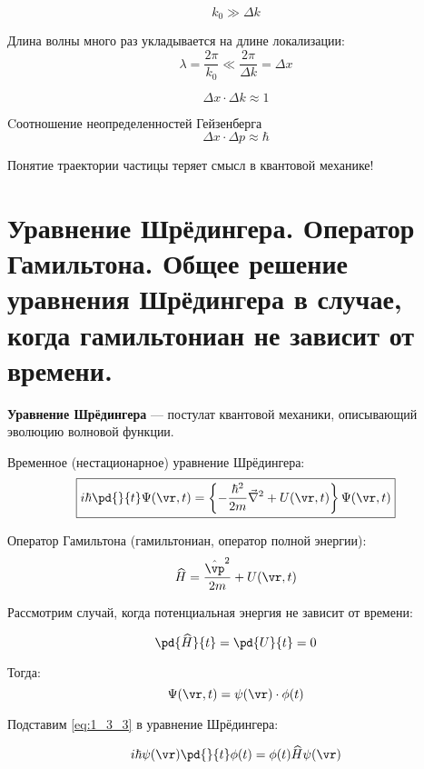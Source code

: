 $$k_0 \gg \Delta k$$

Длина волны много раз укладывается на длине локализации:
$$\lambda = \frac{2 \pi}{k_0} \ll \frac{2 \pi}{\Delta k} = \Delta x$$

\begin{equation}
\label{eq:1_2_9}
\Delta x \cdot \Delta k \approx 1
\end{equation}

Cоотношение неопределенностей Гейзенберга
\begin{equation}
\label{eq:1_2_10}
\boxed{\Delta x \cdot \Delta p \approx \hbar}
\end{equation}

Понятие траектории частицы теряет смысл в квантовой механике!

\begin{sloppypar}
  \section{Уравнение Шрёдингера. Оператор Гамильтона. Общее решение уравнения Шрёдингера в случае, когда гамильтониан не зависит от времени.}
\end{sloppypar}

\textbf{Уравнение Шрёдингера} --- постулат квантовой механики, описывающий эволюцию волновой функции.

Временное (нестационарное) уравнение Шрёдингера:
\begin{equation}
\label{eq:1_3_1}
\boxed{i \hbar \pd{}{t} \Psi(\vr,t) = \left\{ -\frac{\hbar^2}{2m}\vec{\nabla}^2 + U(\vr,t) \right\} \Psi(\vr,t)} 
\end{equation}

Оператор Гамильтона (гамильтониан, оператор полной энергии):
\begin{equation}
\label{eq:1_3_2}
\widehat{H} = \frac{\hat{\vp}^2}{2m} + U(\vr,t)
\end{equation}

Рассмотрим случай, когда потенциальная энергия не зависит от времени:

$$\pd{\widehat{H}}{t} = \pd{U}{t} = 0 $$

Тогда:
\begin{equation}
\label{eq:1_3_3}
\Psi(\vr,t) = \psi(\vr) \cdot \phi (t)
\end{equation}

Подставим \eqref{eq:1_3_3} в уравнение Шрёдингера:

$$i \hbar \psi(\vr) \pd{}{t} \phi (t) = \phi (t) \widehat{H} \psi(\vr)$$


